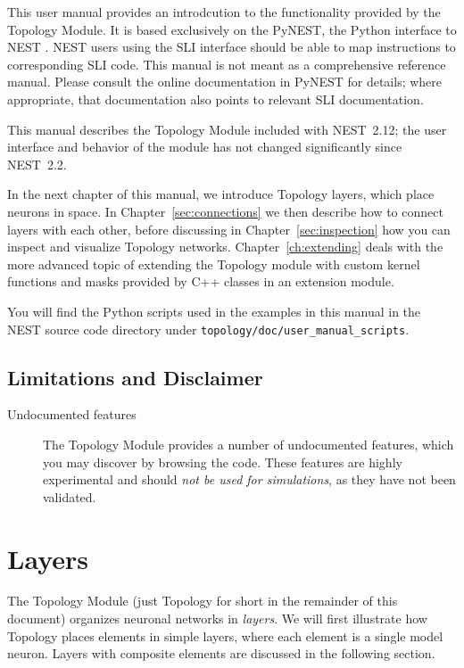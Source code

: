 \documentclass[a4paper,12pt]{report}
\begin{document}
This user manual provides an introdcution to the functionality
provided by the Topology Module. It is based exclusively on the
PyNEST, the Python interface to NEST \citep{Eppl:2008(12)}. NEST users
using the SLI interface should be able to map instructions to
corresponding SLI code. This manual is not meant as a comprehensive
reference manual. Please consult the online documentation in PyNEST
for details; where appropriate, that documentation also points to
relevant SLI documentation.

This manual describes the Topology Module included with NEST~2.12;
the user interface and behavior of the module has not changed 
significantly since NEST~2.2.

In the next chapter of this manual, we introduce Topology layers,
which place neurons in space. In Chapter~\ref{sec:connections} we then
describe how to connect layers with each other, before discussing in
Chapter~\ref{sec:inspection} how you can inspect and visualize
Topology networks. Chapter~\ref{ch:extending} deals with the more advanced
topic of extending the Topology module with custom kernel functions and
masks provided by C++ classes in an extension module.

You will find the Python scripts used in the examples in this manual 
 in the NEST
source code directory under \lstinline!topology/doc/user_manual_scripts!.

\section{Limitations and Disclaimer}\label{sec:limitations}

\begin{description}
\item[Undocumented features] The Topology Module provides a number of undocumented features, which
you may discover by browsing the code. These features are highly
experimental and should \emph{not be used for simulations}, as they
have not been validated.
\end{description}




\chapter{Layers}\label{sec:layers}

The Topology Module (just Topology for short in the remainder of this
document) organizes neuronal networks in \emph{layers}. We will first
illustrate how Topology places elements in simple layers, where each
element is a single model neuron. Layers with composite elements are
discussed in the following section.
\end{document}
